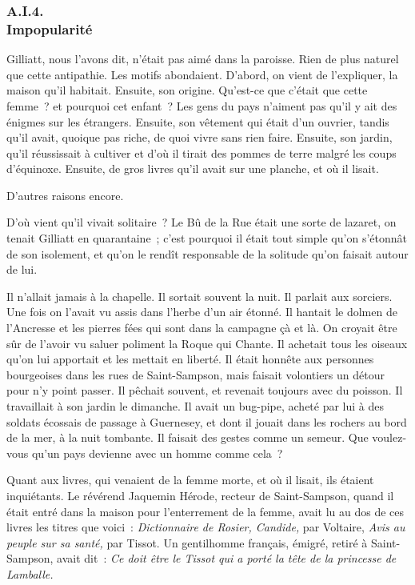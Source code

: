 \documentclass[french,twoside]{book} %
\begin{document}
 \subsubsection[{A.I.4. Impopularité}]{A.I.4. \\
Impopularité}
\noindent Gilliatt, nous l’avons dit, n’était pas aimé dans la paroisse. Rien de plus naturel que cette antipathie. Les motifs abondaient. D’abord, on vient de l’expliquer, la maison qu’il habitait. Ensuite, son origine. Qu’est-ce que c’était que cette femme ? et pourquoi cet enfant ? Les gens du pays n’aiment pas qu’il y ait des énigmes sur les étrangers. Ensuite, son vêtement qui était d’un ouvrier, tandis qu’il avait, quoique pas riche, de quoi vivre sans rien faire. Ensuite, son jardin, qu’il réussissait à cultiver et d’où il tirait des pommes de terre malgré les coups d’équinoxe. Ensuite, de gros livres qu’il avait sur une planche, et où il lisait.\par
D’autres raisons encore.\par
D’où vient qu’il vivait solitaire ? Le Bû de la Rue était une sorte de lazaret, on tenait Gilliatt en quarantaine ; c’est pourquoi il était tout simple qu’on  s’étonnât de son isolement, et qu’on le rendît responsable de la solitude qu’on faisait autour de lui.\par
Il n’allait jamais à la chapelle. Il sortait souvent la nuit. Il parlait aux sorciers. Une fois on l’avait vu assis dans l’herbe d’un air étonné. Il hantait le dolmen de l’Ancresse et les pierres fées qui sont dans la campagne çà et là. On croyait être sûr de l’avoir vu saluer poliment la Roque qui Chante. Il achetait tous les oiseaux qu’on lui apportait et les mettait en liberté. Il était honnête aux personnes bourgeoises dans les rues de Saint-Sampson, mais faisait volontiers un détour pour n’y point passer. Il pêchait souvent, et revenait toujours avec du poisson. Il travaillait à son jardin le dimanche. Il avait un bug-pipe, acheté par lui à des soldats écossais de passage à Guernesey, et dont il jouait dans les rochers au bord de la mer, à la nuit tombante. Il faisait des gestes comme un semeur. Que voulez-vous qu’un pays devienne avec un homme comme cela ?\par
Quant aux livres, qui venaient de la femme morte, et où il lisait, ils étaient inquiétants. Le révérend Jaquemin Hérode, recteur de Saint-Sampson, quand il était entré dans la maison pour l’enterrement de la femme, avait lu au dos de ces livres les titres que voici : \emph{Dictionnaire de Rosier, Candide,} par Voltaire, \emph{Avis au peuple sur sa santé,} par Tissot. Un gentilhomme français, émigré, retiré à Saint-Sampson, avait dit : \emph{Ce doit être le Tissot qui a porté la tête de la princesse de Lamballe.}\par
\end{document}
